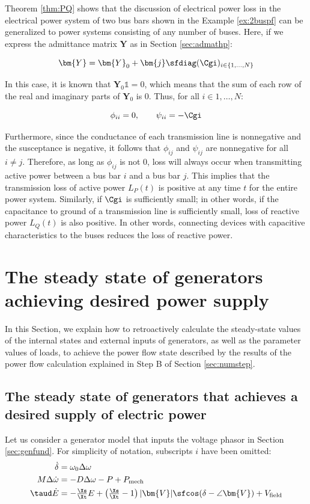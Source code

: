 \documentclass[graybox, envcountchap]{svmult}
\begin{document}
Theorem \ref{thm:PQ} shows that the discussion of electrical power loss in the
electrical power system of two bus bars shown in the Example \ref{ex:2buspf} can
be generalized to power systems consisting of any number of buses. Here, if we
express the admittance matrix $\bm{Y}$ as in Section \ref{sec:admathp}:

\[
  \bm{Y}=\bm{Y}_0 + \bm{j} \sfdiag(\Cgi)_{i\in \{1,\ldots,N\} }
\]

In this case, it is known that $\bm{Y}_0 \mathds{1}=0$, which means that the sum
of each row of the real and imaginary parts of $\bm{Y}_0$ is 0. Thus, for all
$i\in{1,\ldots,N}$:

\[
  \phi_{ii}=0,\qquad
  \psi_{ii}= - \Cgi
\]

Furthermore, since the conductance of each transmission line is nonnegative and
the susceptance is negative, it follows that $\phi_{ij}$ and $\psi_{ij}$ are
nonnegative for all $i\neq j$. Therefore, as long as $\phi_{ij}$ is not 0, loss
will always occur when transmitting active power between a bus bar $i$ and a bus
bar $j$.  This implies that the transmission loss of active power $L_P(t)$ is
positive at any time $t$ for the entire power system. Similarly, if $\Cgi$ is
sufficiently small; in other words, if the capacitance to ground of a
transmission line is sufficiently small, loss of reactive power $L_Q(t)$ is also
positive. In other words, connecting devices with capacitive characteristics to
the buses reduces the loss of reactive power.

\section{The steady state of generators achieving desired power
supply}\label{sec:paradef}

In this Section, we explain how to retroactively calculate the steady-state
values of the internal states and external inputs of generators, as well as the
parameter values of loads, to achieve the power flow state described by the
results of the power flow calculation explained in Step B of Section
\ref{sec:numstep}.

\subsection{The steady state of generators that achieves a desired supply of electric power}\label{sec:stagen}

Let us consider a generator model that inputs the voltage phasor in Section
\ref{sec:genfund}. For simplicity of notation, subscripts $i$ have been
omitted:
\begin{equation}\label{eq:gendif_}
  \begin{aligned}
    \dot{\delta}&= \omega_0  \Delta \omega\\
    M   \Delta \dot{\omega}&= 
    - D \Delta\omega  
    - P
    +P_{{\rm mech}}
    \\
    \taud \dot{E} & = 
    -\tfrac{ \Xs }{ \Xt }E
    +\left(
    \tfrac{ \Xs }{ \Xt } -1
    \right)
    |\bm{V}| \sfcos (\delta - \angle \bm{V} ) 
    + V_{{\rm field}}
  \end{aligned}
\end{equation}
\end{document}
